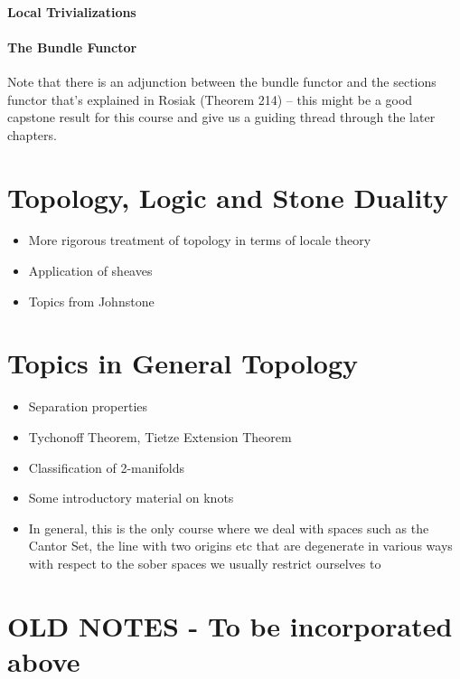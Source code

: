 \documentclass[oneside,english]{amsbook}
\numberwithin{section}{chapter}
\theoremstyle{plain}
\theoremstyle{definition}
\begin{document}
\subsection{Local Trivializations}

\subsection{The Bundle Functor}

Note that there is an adjunction between the bundle functor and the sections functor that's explained in Rosiak (Theorem 214) -- this might be a good capstone result for this course and give us a guiding thread through the later chapters. 





\part{Topology, Logic and Stone Duality}
\begin{itemize}
	\item{More rigorous treatment of topology in terms of locale theory}
	\item{Application of sheaves}
	\item{Topics from Johnstone}
\end{itemize}

\part{Topics in General Topology}

\begin{itemize}
	\item{Separation properties}
	\item{Tychonoff Theorem, Tietze Extension Theorem}
	\item{Classification of 2-manifolds}
	\item{Some introductory material on knots}
	\item{In general, this is the only course where we deal with spaces such as the Cantor Set, the line with two origins etc that are degenerate in various ways with respect to the sober spaces we usually restrict ourselves to}
\end{itemize}

\part{OLD NOTES - To be incorporated above}
\end{document}
